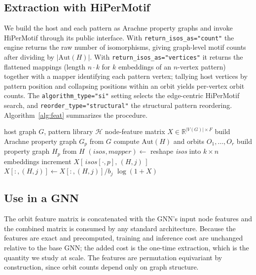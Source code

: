 \documentclass[conference]{IEEEtran}
\begin{document}
\subsection{Extraction with HiPerMotif}
We build the host and each pattern as Arachne property graphs and invoke
HiPerMotif through its public interface. With \texttt{return\_isos\_as="count"} the
engine returns the raw number of isomorphisms, giving graph-level motif counts after
dividing by $|\mathrm{Aut}(H)|$. With \texttt{return\_isos\_as="vertices"} it
returns the flattened mappings (length $n\cdot k$ for $k$ embeddings of an
$n$-vertex pattern) together with a mapper identifying each pattern vertex; tallying
host vertices by pattern position and collapsing positions within an orbit yields
per-vertex orbit counts. The \texttt{algorithm\_type="si"} setting selects the
edge-centric HiPerMotif search, and \texttt{reorder\_type="structural"} the
structural pattern reordering. Algorithm~\ref{alg:feat} summarizes the procedure.

\begin{algorithm}[t]
\caption{Exact orbit features via HiPerMotif}
\label{alg:feat}
\begin{algorithmic}[1]
\Require host graph $G$, pattern library $\mathcal{H}$
\Ensure node-feature matrix $X \in \mathbb{R}^{|V(G)|\times F}$
\State build Arachne property graph $G_p$ from $G$
  \State compute $\mathrm{Aut}(H)$ and orbits $O_1,\dots,O_r$ 
  \State build property graph $H_p$ from $H$
  \State $(\textit{isos},\textit{mapper}) \gets$ 
  \State reshape \textit{isos} into $k\times n$ embeddings
     
      \State increment $X[\,\textit{isos}[\cdot,p],\,(H,j)\,]$
    \EndFor
    \State $X[:,(H,j)] \gets X[:,(H,j)] / b_j$
  \EndFor
\EndFor
\State \Return $\log(1+X)$ 
\end{algorithmic}
\end{algorithm}

\subsection{Use in a GNN}
The orbit feature matrix is concatenated with the GNN's input node features and the
combined matrix is consumed by any standard architecture. Because the features are
exact and precomputed, training and inference cost are unchanged relative to the
base GNN; the added cost is the one-time extraction, which is the quantity we study
at scale. The features are permutation equivariant by construction, since orbit
counts depend only on graph structure.
\end{document}

